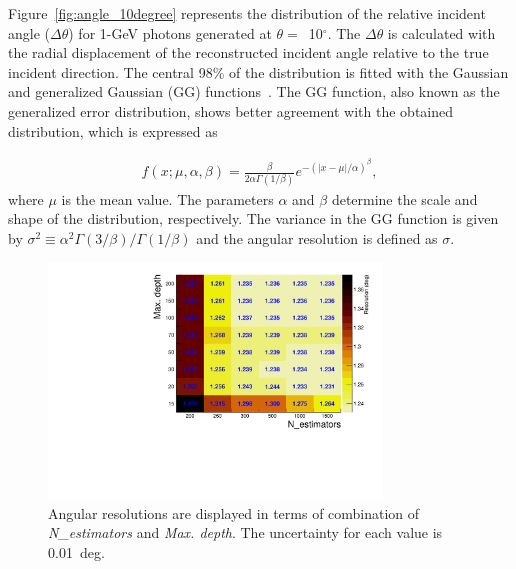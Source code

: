 \documentclass[12pt,times,draftclsnofoot,a4paper]{elsarticle}
\begin{document}
Figure~\ref{fig:angle_10degree} represents the distribution of the relative incident angle ($\Delta\theta$) for 1-GeV photons generated at $\theta=$~10$^{\circ}$. The $\Delta\theta$ is calculated with the radial displacement of the reconstructed incident angle relative to the true incident direction. The central 98\% of the distribution is fitted with the Gaussian and generalized Gaussian (GG) functions~\cite{GGfun}. The GG function, also known as the generalized error distribution, shows better agreement with the obtained distribution, which is expressed as

\begin{eqnarray} 
f(x; \mu, \alpha, \beta) = \frac{\beta}{2 \alpha \Gamma(1/\beta)}e^{-(|x-\mu|/\alpha)^\beta},
\label{eqn:gg}
\end{eqnarray}
where $\mu$ is the mean value. The parameters $\alpha$ and $\beta$ determine the scale and shape of the distribution, respectively. The variance in the GG function is given by $\sigma^2 \equiv \alpha^2 \Gamma(3/\beta) / \Gamma(1/\beta)$ and the angular resolution is defined as $\sigma$. %

\begin{figure}[!hbt]
\centering
\includegraphics[width=0.79\textwidth]{Fig4_include_ne250.pdf}
\caption{Angular resolutions are displayed in terms of combination of \textit{N\_estimators} and \textit{Max. depth}. The uncertainty for each value is 0.01~deg. }
\label{fig:par_scan}
\end{figure}
\end{document}
